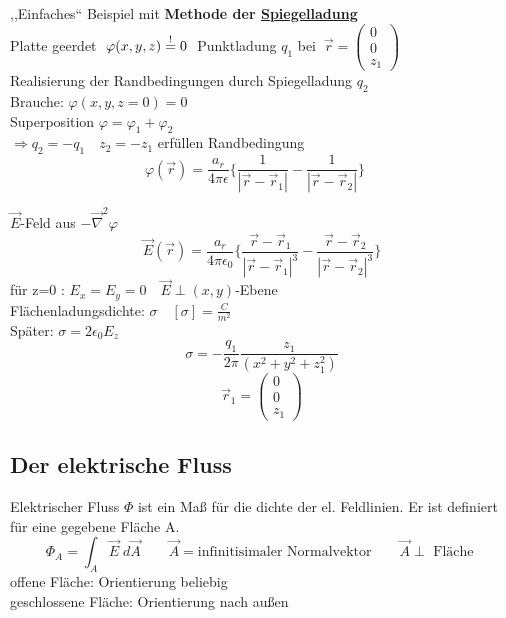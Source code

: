 \documentclass[titlepage,12pt,a4paper,ngerman]{report}
\begin{document}
,,Einfaches`` Beispiel mit \textbf{Methode der \underline{Spiegelladung}}\\
Platte geerdet $\ \varphi(x,y,z) \buildrel ! \over = 0 \ $
Punktladung $q_1$ bei $\ \vec{r} = \begin{pmatrix}
0\\
0\\
z_1
\end{pmatrix}$\\
Realisierung der Randbedingungen durch Spiegelladung $q_2$\\
Brauche: $\varphi(x,y,z=0) = 0$\\
Superposition $\varphi = \varphi_1 + \varphi_2$\\
$\Rightarrow q_2 = - q_1 \quad z_2 = - z_1$ erfüllen Randbedingung\\
$$\varphi(\vec{r}) = \frac{a_r}{4\pi\epsilon} \bigg\{ \frac{1}{|\vec{r}-\vec{r}_1|} - \frac{1}{| \vec{r} - \vec{r}_2|} \bigg \} \quad $$

$\vec{E}$-Feld aus $-\vec{\nabla}^2 \varphi$\\
$$ \vec{E}(\vec{r}) = \frac{a_r}{4\pi\epsilon_0} \bigg\{ \frac{\vec{r} - \vec{r}_1}{|\vec{r} - \vec{r}_1|^3} - \frac{\vec{r} - \vec{r}_2}{|\vec{r} - \vec{r}_2|^3} \bigg\}$$
für z=0 : $ E_x = E_y = 0 \quad \vec{E} \perp (x,y)$-Ebene\\
Flächenladungsdichte: $\sigma \quad [\sigma] = \frac{C}{m^2}$\\
Später: $ \sigma = 2 \epsilon_0 E_z$
$$\sigma = - \frac{q_1}{2\pi} \frac{z_1}{(x^2+y^2+z_1^2)}$$
$$ \vec{r}_1 = \begin{pmatrix}
0\\0\\z_1
\end{pmatrix}$$

\subsection{Der elektrische Fluss}
Elektrischer Fluss $\Phi$ ist ein Maß für die dichte der el. Feldlinien. Er ist definiert für eine gegebene Fläche A.
$$ \boxed{\Phi_A = \int_{A} \vec{E} \;d \vec{A}} \qquad \vec{A} = \textrm{infinitisimaler Normalvektor} \qquad \vec{A} \perp \textrm{ Fläche }$$
offene Fläche: Orientierung beliebig\\
geschlossene Fläche: Orientierung nach außen\\[5pt]
\end{document}
